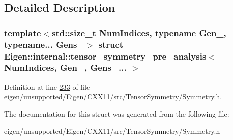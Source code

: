 \subsection{Detailed Description}
\subsubsection*{template$<$std\+::size\+\_\+t Num\+Indices, typename Gen\+\_\+, typename... Gens\+\_\+$>$\newline
struct Eigen\+::internal\+::tensor\+\_\+symmetry\+\_\+pre\+\_\+analysis$<$ Num\+Indices, Gen\+\_\+, Gens\+\_\+... $>$}



Definition at line \hyperlink{eigen_2unsupported_2_eigen_2_c_x_x11_2src_2_tensor_symmetry_2_symmetry_8h_source_l00233}{233} of file \hyperlink{eigen_2unsupported_2_eigen_2_c_x_x11_2src_2_tensor_symmetry_2_symmetry_8h_source}{eigen/unsupported/\+Eigen/\+C\+X\+X11/src/\+Tensor\+Symmetry/\+Symmetry.\+h}.



The documentation for this struct was generated from the following file\+:\begin{DoxyCompactItemize}
\item 
eigen/unsupported/\+Eigen/\+C\+X\+X11/src/\+Tensor\+Symmetry/\+Symmetry.\+h\end{DoxyCompactItemize}
